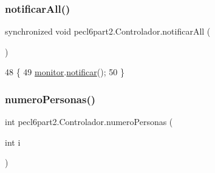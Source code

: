 \subsubsection{\texorpdfstring{notificar\+All()}{notificarAll()}}
{\footnotesize\ttfamily synchronized void pecl6part2.\+Controlador.\+notificar\+All (\begin{DoxyParamCaption}{ }\end{DoxyParamCaption})\hspace{0.3cm}{\ttfamily [inline]}}


\begin{DoxyCode}
48     \{
49         \mbox{\hyperlink{classpecl6part2_1_1_controlador_a7fc29467f824a892431dc36c908857c7}{monitor}}.\mbox{\hyperlink{classpecl6part2_1_1_monitor_a77ff6dc9ee3ab70a9f20daea657d856b}{notificar}}();
50     \}
\end{DoxyCode}
\mbox{\label{classpecl6part2_1_1_controlador_a92fef133fc0a5fcfa1b483b83a4d3f7d}} 
\subsubsection{\texorpdfstring{numero\+Personas()}{numeroPersonas()}}
{\footnotesize\ttfamily int pecl6part2.\+Controlador.\+numero\+Personas (\begin{DoxyParamCaption}\item[{int}]{i }\end{DoxyParamCaption})\hspace{0.3cm}{\ttfamily [inline]}}


